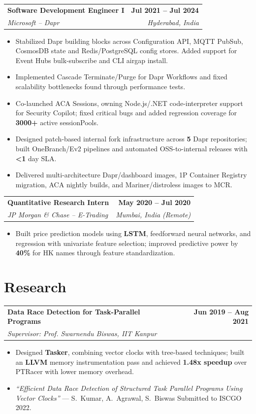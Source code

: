 \documentclass[a4paper,9pt]{extarticle}
\makeatletter
\newcommand{\resumeTextSpacing}{\setlength{\baselineskip}{11.0pt}\spaceskip=0.34em plus 0.08em minus 0.03em\xspaceskip=0.45em plus 0.10em minus 0.04em}
\newcommand{\resumeSubheading}[4]{
  \vspace{2pt}
  \begin{tabularx}{\textwidth}{@{}Xr@{}}
    \textbf{\color{textgray}#1} & \textbf{\small #2} \\
    {\small\textit{#3}} & {\small\textit{#4}} \\
  \end{tabularx}
  \vspace{-4pt}
}
\newcommand{\resumeItemPlain}[1]{\item #1}
\newenvironment{resumeItemList}{
  \begin{itemize}[
    leftmargin=0.18in,
    label={\color{accent}\bfseries--},
    itemsep=0.4pt,
    topsep=1.0pt,
    parsep=0pt,
    partopsep=0pt
  ]\resumeTextSpacing
}{
  \end{itemize}\vspace{0pt}
}
\makeatother
\begin{document}
\resumeSubheading
  {Software Development Engineer I}{Jul 2021 -- Jul 2024}
  {Microsoft -- Dapr}{Hyderabad, India}
\begin{resumeItemList}
  \resumeItemPlain{Stabilized Dapr building blocks across Configuration API, MQTT PubSub, CosmosDB state and Redis/PostgreSQL config stores. Added support for Event Hubs bulk-subscribe and CLI airgap install.}
  \resumeItemPlain{Implemented Cascade Terminate/Purge for Dapr Workflows and fixed scalability bottlenecks found through performance tests.}
  \resumeItemPlain{Co-launched ACA Sessions, owning Node.js/.NET code-interpreter support for Security Copilot; fixed critical bugs and added regression coverage for \textbf{3000+} active sessionPools.}
  \resumeItemPlain{Designed patch-based internal fork infrastructure across \textbf{5} Dapr repositories; built OneBranch/Ev2 pipelines and automated OSS-to-internal releases with \textbf{<1} day SLA.}
  \resumeItemPlain{Delivered multi-architecture Dapr/dashboard images, 1P Container Registry migration, ACA nightly builds, and Mariner/distroless images to MCR.}
\end{resumeItemList}

\resumeSubheading
  {Quantitative Research Intern}{May 2020 -- Jul 2020}
  {JP Morgan \& Chase -- E-Trading}{Mumbai, India (Remote)}
\begin{resumeItemList}
  \resumeItemPlain{Built price prediction models using \textbf{LSTM}, feedforward neural networks, and regression with univariate feature selection; improved predictive power by \textbf{40\%} for HK names through feature standardization.}
\end{resumeItemList}

\section{Research}
\resumeSubheading
  {Data Race Detection for Task-Parallel Programs}{Jun 2019 -- Aug 2021}
  {Supervisor: Prof. Swarnendu Biswas, IIT Kanpur}{}
\begin{resumeItemList}
  \resumeItemPlain{Designed \textbf{Tasker}, combining vector clocks with tree-based techniques; built an \textbf{LLVM} memory instrumentation pass and achieved \textbf{1.48x speedup} over PTRacer with lower memory overhead.}
  \resumeItemPlain{\textit{``Efficient Data Race Detection of Structured Task Parallel Programs Using Vector Clocks''} --- S.~Kumar, A.~Agrawal, S.~Biswas \textbar{} Submitted to ISCGO 2022.}
\end{resumeItemList}
\end{document}
